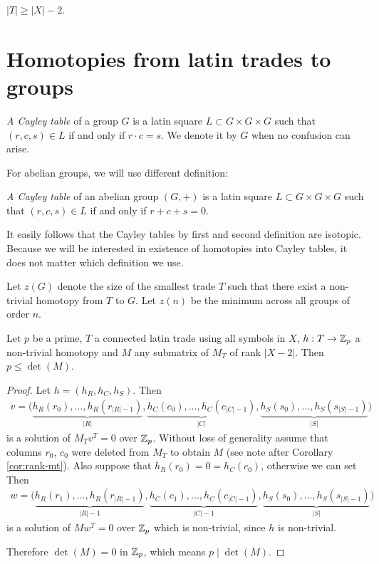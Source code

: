 \begin{cor}
\label{cor:size-of-t}
$|T| \geq |X|-2$.
\end{cor}

\section{Homotopies from latin trades to groups}

\begin{defn}
\emph{A Cayley table} of a group $G$ is a latin square $L \subset G \times G \times G$ such that $(r,c,s) \in L$ if and only if $r \cdot c = s$. We denote it by $G$ when no confusion can arise.
\end{defn}

For abelian groups, we will use different definition:

\begin{defn}
\emph{A Cayley table} of an abelian group $(G,+)$ is a latin square $L \subset G \times G \times G$ such that $(r,c,s) \in L$ if and only if $r + c + s = 0$.
\end{defn}

It easily follows that the Cayley tables by first and second definition are isotopic. Because we will be interested in existence of homotopies into Cayley tables, it does not matter which definition we use.

\begin{defn}
Let $z(G)$ denote the size of the smallest trade $T$ such that there exist a non-trivial homotopy from $T$ to $G$. Let \emph{$z(n)$} be the minimum across all groups of order $n$.
\end{defn}

\begin{lem}
\label{lem:p-leq-det}
Let $p$ be a prime, $T$ a connected latin trade using all symbols in $X$, $h: T \rightarrow \mathbb Z_p$ a non-trivial homotopy and $M$ any submatrix of $M_T$ of rank $|X-2|$. Then $p \leq \det(M)$.
\end{lem}
\begin{proof}
Let $h = (h_R,h_C,h_S)$. Then
\begin{align*}
	v = \big(\underbrace{h_R(r_0), \dots, h_R(r_{|R|-1})}_{|R|},\underbrace{h_C(c_0), \dots, h_C(c_{|C|-1})}_{|C|}, \underbrace{h_S(s_0), \dots, h_S(s_{|S|-1})}_{|S|}\big)
\end{align*}
is a solution of $M_Tv^T = 0$ over $\mathbb Z_p$. Without loss of generality assume that columns $r_0$, $c_0$ were deleted from $M_T$ to obtain $M$ (see note after Corollary \ref{cor:rank-mt}). Also suppose that $h_R(r_0) = 0 = h_C(c_0)$, otherwise we can set
%
Then
\begin{align*}
	w = \big(\underbrace{h_R(r_1), \dots, h_R(r_{|R|-1})}_{|R|-1},\underbrace{h_C(c_1), \dots, h_C(c_{|C|-1})}_{|C|-1}, \underbrace{h_S(s_0), \dots, h_S(s_{|S|-1})}_{|S|}\big)
\end{align*}
is a solution of $Mw^T = 0$ over $\mathbb Z_p$ which is non-trivial, since $h$ is non-trivial.

Therefore $\det(M) = 0$ in $\mathbb Z_p$, which means $p \mid \det(M)$.
\end{proof}

